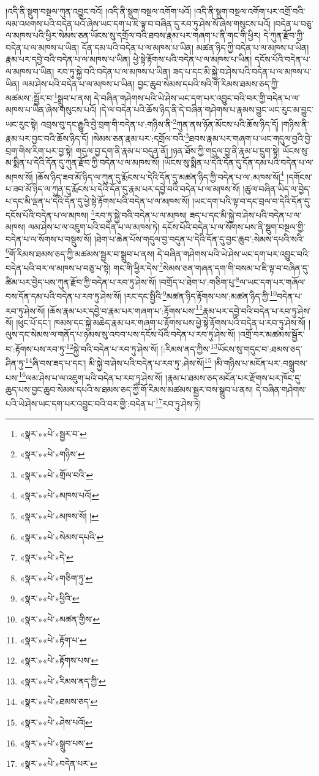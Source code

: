 །འདི་ནི་སྡུག་བསྔལ་ཀུན་འབྱུང་བའོ། །འདི་ནི་སྡུག་བསྔལ་འགོག་པའོ། །འདི་ནི་སྡུག་བསྔལ་འགོག་པར་འགྲོ་བའི་ལམ་འཕགས་པའི་བདེན་པའོ་ཞེས་ཡང་དག་པ་ཇི་ལྟ་བ་བཞིན་དུ་རབ་ཏུ་ཤེས་སོ་ཞེས་གསུངས་པའོ། །བདེན་པ་བཅུ་ལ་མཁས་པའི་ཕྱིར་སེམས་ཅན་ཡོངས་སུ་དགྲོལ་བའི་ཐབས་རྣམ་པར་གཞག་པ་ནི་གང་གི་ཕྱིར། དེ་ཀུན་རྫོབ་ཀྱི་བདེན་པ་ལ་མཁས་པ་ཡིན། དོན་དམ་པའི་བདེན་པ་ལ་མཁས་པ་ཡིན། མཚན་ཉིད་ཀྱི་བདེན་པ་ལ་མཁས་པ་ཡིན། རྣམ་པར་དབྱེ་བའི་བདེན་པ་ལ་མཁས་པ་ཡིན། ཕྱེ་སྟེ་རྟོགས་པའི་བདེན་པ་ལ་མཁས་པ་ཡིན། དངོས་པོའི་བདེན་པ་ལ་མཁས་པ་ཡིན། རབ་ཏུ་སྐྱེ་བའི་བདེན་པ་ལ་མཁས་པ་ཡིན། ཟད་པ་དང་མི་སྐྱེ་བ་ཤེས་པའི་བདེན་པ་ལ་མཁས་པ་ཡིན། ལམ་ཤེས་པའི་བདེན་པ་ལ་མཁས་པ་ཡིན། བྱང་ཆུབ་སེམས་དཔའི་སའི་གོ་རིམས་ཐམས་ཅད་ཀྱི་མཚམས་:སྦྱོར་བ་\footnote{«སྣར་»«པེ་»སྦྱར་བ་}སྒྲུབ་པ་ནས། དེ་བཞིན་གཤེགས་པའི་ཡེ་ཤེས་ཡང་དག་པར་འབྱུང་བའི་བར་གྱི་བདེན་པ་ལ་མཁས་པ་ཡིན་ཞེས་གསུངས་པའོ། །དེ་ལ་བདེན་པའི་ཆོས་ཉིད་ནི་དེ་བཞིན་གཤེགས་པ་རྣམས་བྱུང་ཡང་རུང་མ་བྱུང་ཡང་རུང་སྟེ། འབྲས་བུ་དང་རྒྱུའི་བྱེ་བྲག་གི་བདེན་པ་:གཉིས་ནི་\footnote{«སྣར་»«པེ་»གཉིས་}ཀུན་ནས་ཉོན་མོངས་པའི་ཆོས་ཉིད་དོ། །གཉིས་ནི་རྣམ་པར་བྱང་བའི་ཆོས་ཉིད་དོ། །སེམས་ཅན་རྣམ་པར་:དགྲོལ་བའི་\footnote{«སྣར་»«པེ་»གྲོལ་བའི་}ཐབས་རྣམ་པར་གཞག་པ་ཡང་གདུལ་བྱའི་བྱེ་བྲག་གིས་རིག་པར་བྱ་སྟེ། གདུལ་བྱ་དག་ནི་རྣམ་པ་བདུན་ནོ། །ཉན་ཐོས་ཀྱི་གདུལ་བྱ་ནི་རྣམ་པ་དྲུག་སྟེ། ཡོངས་སུ་མ་སྨིན་པ་དེའི་དོན་དུ་ཀུན་རྫོབ་ཀྱི་བདེན་པ་ལ་མཁས་སོ། །ཡོངས་སུ་སྨིན་པ་དེའི་དོན་དུ་དོན་དམ་པའི་བདེན་པ་ལ་མཁས་སོ། །ཆོས་ཉིད་ཟབ་མོ་ཉིད་ལ་ཀུན་དུ་རྨོངས་པ་དེའི་དོན་དུ་མཚན་ཉིད་ཀྱི་བདེན་པ་ལ་:མཁས་སོ།\footnote{«སྣར་»«པེ་»མཁས་པའོ།} །དགོངས་པ་ཟབ་མོ་ཉིད་ལ་ཀུན་དུ་རྨོངས་པ་དེའི་དོན་དུ་རྣམ་པར་དབྱེ་བའི་བདེན་པ་ལ་མཁས་སོ། །ཚུལ་བཞིན་ཡིད་ལ་བྱེད་པ་དང་མི་ལྡན་པ་དེའི་དོན་དུ་ཕྱེ་སྟེ་རྟོགས་པའི་བདེན་པ་ལ་མཁས་སོ། །ཡང་དག་པའི་ལྟ་བ་དང་བྲལ་བ་དེའི་དོན་དུ་དངོས་པོའི་བདེན་པ་ལ་མཁས། \footnote{«སྣར་»«པེ་»མཁས་སོ། ། }རབ་ཏུ་སྐྱེ་བའི་བདེན་པ་ལ་མཁས། ཟད་པ་དང་མི་སྐྱེ་བ་ཤེས་པའི་བདེན་པ་ལ་མཁས། ལམ་ཤེས་པ་ལ་འཇུག་པའི་བདེན་པ་ལ་མཁས་ཏེ། དངོས་པོའི་བདེན་པ་ལ་སོགས་པས་ནི་སྡུག་བསྔལ་གྱི་བདེན་པ་ལ་སོགས་པ་བསྡུས་སོ། །ཐེག་པ་ཆེན་པོས་གདུལ་བྱ་བདུན་པ་དེའི་དོན་དུ་བྱང་ཆུབ་:སེམས་དཔའི་སའི་\footnote{«སྣར་»«པེ་»སེམས་དཔའི་}གོ་རིམས་ཐམས་ཅད་ཀྱི་མཚམས་སྦྱར་བ་སྒྲུབ་པ་ནས། དེ་བཞིན་གཤེགས་པའི་ཡེ་ཤེས་ཡང་དག་པར་འབྱུང་བའི་བདེན་པའི་བར་ལ་མཁས་པ་བཅུ་པ་སྟེ། གང་གི་ཕྱིར་དེས་\footnote{«སྣར་»«པེ་»དེ་}སེམས་ཅན་གཞན་དག་གི་བསམ་པ་ཇི་ལྟ་བ་བཞིན་དུ་ཚིམ་པར་བྱེད་པས་ཀུན་རྫོབ་ཀྱི་བདེན་པ་རབ་ཏུ་ཤེས་སོ། །བགྲོད་པ་ཐེག་པ་:གཅིག་པུ་\footnote{«སྣར་»«པེ་»གཅིག་ཏུ་}ལ་ཡང་དག་པར་གཞོལ་བས་དོན་དམ་པའི་བདེན་པ་རབ་ཏུ་ཤེས་སོ། །རང་དང་སྤྱིའི་\footnote{«སྣར་»«པེ་»ཕྱིའི་}མཚན་ཉིད་རྟོགས་པས་:མཚན་ཉིད་ཀྱི་\footnote{«སྣར་»«པེ་»མཚན་གྱིས་}བདེན་པ་རབ་ཏུ་ཤེས་སོ། །ཆོས་རྣམ་པར་དབྱེ་བ་རྣམ་པར་གཞག་པ་:རྟོགས་པས་\footnote{«སྣར་»«པེ་»རྟོག་པ་}རྣམ་པར་དབྱེ་བའི་བདེན་པ་རབ་ཏུ་ཤེས་སོ། །ཕུང་པོ་དང་། ཁམས་དང་སྐྱེ་མཆེད་རྣམ་པར་གཞག་པ་རྟོགས་པས་ཕྱེ་སྟེ་རྟོགས་པའི་བདེན་པ་རབ་ཏུ་ཤེས་སོ། །ལུས་དང་སེམས་ལ་གནོད་པ་ཉམས་སུ་འབབ་པས་དངོས་པོའི་བདེན་པ་རབ་ཏུ་ཤེས་སོ། །འགྲོ་བར་མཚམས་སྦྱོར་བ་:རྟོགས་པས་རབ་ཏུ་\footnote{«སྣར་»«པེ་»རྟོགས་པས་}སྐྱེ་བའི་བདེན་པ་རབ་ཏུ་ཤེས་སོ། །:རིམས་ནད་ཀྱིས་\footnote{«སྣར་»«པེ་»རིམས་ནད་ཀྱི་}ཡོངས་སུ་གདུང་བ་:ཐམས་ཅད་ཤིན་ཏུ་\footnote{«སྣར་»«པེ་»ཐམས་ཅད་}ཞི་བས་ཟད་པ་དང་། མི་སྐྱེ་བ་ཤེས་པའི་བདེན་པ་རབ་ཏུ་:ཤེས་སོ།\footnote{«སྣར་»«པེ་»ཤེས་པའོ།} །མི་གཉིས་པ་མངོན་པར་:བསྒྲུབས་པས་\footnote{«སྣར་»«པེ་»སྒྲུབ་པས་}ལམ་ཤེས་པ་ལ་འཇུག་པའི་བདེན་པ་རབ་ཏུ་ཤེས་སོ། །རྣམ་པ་ཐམས་ཅད་མངོན་པར་རྫོགས་པར་ཁོང་དུ་ཆུད་པས་བྱང་ཆུབ་སེམས་དཔའི་ས་ཐམས་ཅད་ཀྱི་གོ་རིམས་མཚམས་སྦྱར་བས་སྒྲུབ་པ་ནས། དེ་བཞིན་གཤེགས་པའི་ཡེ་ཤེས་ཡང་དག་པར་འབྱུང་བའི་བར་གྱི་:བདེན་པ་\footnote{«སྣར་»«པེ་»བདེན་པར་}རབ་ཏུ་ཤེས་ཏེ། 